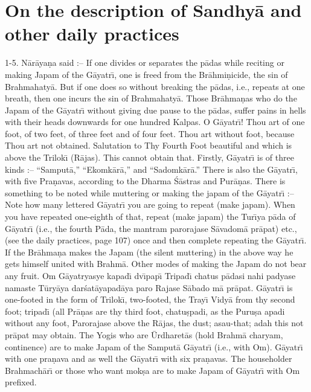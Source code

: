\chapter{On the description of Sandhy\=a and other daily practices}

1-5. N\=ar\=aya\d{n}a said :-- If one divides or separates the p\=adas while reciting or making Japam of the G\=ayatr\={\i}, one is freed from the Br\=ahmi\d{n}icide, the sin of Brahmahaty\=a. But if one does so without breaking the p\=adas, i.e., repeats at one breath, then one incurs the sin of Brahmahaty\=a. Those Br\=ahma\d{n}as who do the Japam of the G\=ayatr\={\i} without giving due pause to the p\=adas, suffer pains in hells with their heads downwards for one hundred Kalpas. O G\=ayatr\={\i}! Thou art of one foot, of two feet, of three feet and of four feet. Thou art without foot, because Thou art not obtained. Salutation to Thy Fourth Foot beautiful and which is above the Trilok\={\i} (R\=ajas). This cannot obtain that. Firstly, G\=ayatr\={\i} is of three kinds :-- ``Samput\=a,'' ``Ekomk\=ar\=a,'' and ``Sadomk\=ar\=a.'' There is also the G\=ayatr\={\i}, with five Pra\d{n}avas, according to the Dharma \'S\=astras and Pur\=a\d{n}as. There is something to be noted while muttering or making the japam of the G\=ayatr\={\i} :-- Note how many lettered G\=ayatr\={\i} you are going to repeat (make japam). When you have repeated one-eighth of that, repeat (make japam) the Tur\={\i}ya p\=ada of G\=ayatr\={\i} (i.e., the fourth P\=ada, the mantram parorajase S\=avadom\=a pr\=apat) etc., (see the daily practices, page 107) once and then complete repeating the G\=ayatr\={\i}. If the Br\=ahma\d{n}a makes the Japam (the silent muttering) in the above way he gets himself united with Brahm\=a. Other modes of making the Japam do not bear any fruit. Om G\=ayatryasye kapad\={\i} dv\={\i}pap\={\i} Tripad\={\i} chatus p\=adasi nahi padyase namaste T\=ury\=aya dar\'sat\=ayapad\=aya paro Rajase S\=abado m\=a pr\=apat. G\=ayatr\={\i} is one-footed in the form of Trilok\={\i}, two-footed, the Tray\={\i} Vidy\=a from thy second foot; tripad\={\i} (all Pr\=a\d{n}as are thy third foot, chatu\d{s}padi, as the Puru\d{s}a apadi without any foot, Parorajase above the R\=ajas, the dust; asau-that; adah this not pr\=apat may obtain. The Yogis who are \=Urdharet\=as (hold Brahm\=a charyam, continence) are to make Japam of the Samput\=a G\=ayatr\={\i} (i.e., with Om). G\=ayatr\={\i} with one pra\d{n}ava and as well the G\=ayatr\={\i} with six pra\d{n}avas. The householder Brahmach\=ar\={\i} or those who want mok\d{s}a are to make Japam of G\=ayatr\={\i} with Om prefixed.

